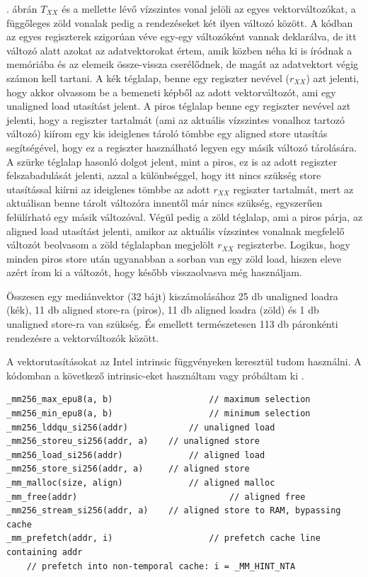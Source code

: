 			. ábrán $T_{XX}$ és a mellette lévő vízszintes vonal jelöli az egyes vektorváltozókat, a függőleges zöld vonalak pedig a rendezéseket két ilyen változó között. A kódban az egyes regiszterek szigorúan véve egy-egy változóként vannak deklarálva, de itt változó alatt azokat az adatvektorokat értem, amik közben néha ki is íródnak a memóriába és az elemeik össze-vissza cserélődnek, de magát az adatvektort végig számon kell tartani. A kék téglalap, benne egy regiszter nevével ($r_{XX}$) azt jelenti, hogy akkor olvassom be a bemeneti képből az adott vektorváltozót, ami egy unaligned load utasítást jelent. A piros téglalap benne egy regiszter nevével azt jelenti, hogy a regiszter tartalmát (ami az aktuális vízszintes vonalhoz tartozó változó) kiírom egy kis ideiglenes tároló tömbbe egy aligned store utasítás segítségével, hogy ez a regiszter használható legyen egy másik változó tárolására. A szürke téglalap hasonló dolgot jelent, mint a piros, ez is az adott regiszter felszabadulását jelenti, azzal a különbséggel, hogy itt nincs szükség store utasítással kiírni az ideiglenes tömbbe az adott $r_{XX}$ regiszter tartalmát, mert az aktuálisan benne tárolt változóra innentől már nincs szükség, egyszerűen felülírható egy másik változóval. Végül pedig a zöld téglalap, ami a piros párja, az aligned load utasítást jelenti, amikor az aktuális vízszintes vonalnak megfelelő változót beolvasom a zöld téglalapban megjelölt $r_{XX}$ regiszterbe. Logikus, hogy minden piros store után ugyanabban a sorban van egy zöld load, hiszen eleve azért írom ki a változót, hogy később visszaolvasva még használjam.

			Összesen egy mediánvektor (32 bájt) kiszámolásához 25 db unaligned loadra (kék), 11 db aligned store-ra (piros), 11 db aligned loadra (zöld) és 1 db unaligned store-ra van szükség. És emellett természetesen 113 db páronkénti rendezésre a vektorváltozók között.


			A vektorutasításokat az Intel intrinsic függvényeken keresztül tudom használni. A kódomban a következő intrinsic-eket használtam vagy próbáltam ki \cite{intrinsics}.

			\begin{lstlisting}
_mm256_max_epu8(a, b)					// maximum selection
_mm256_min_epu8(a, b)					// minimum selection
_mm256_lddqu_si256(addr)			// unaligned load
_mm256_storeu_si256(addr, a)	// unaligned store
_mm256_load_si256(addr)				// aligned load
_mm256_store_si256(addr, a)		// aligned store
_mm_malloc(size, align)				// aligned malloc
_mm_free(addr)								// aligned free
_mm256_stream_si256(addr, a)	// aligned store to RAM, bypassing cache
_mm_prefetch(addr, i)					// prefetch cache line containing addr
	// prefetch into non-temporal cache: i = _MM_HINT_NTA\end{lstlisting}

